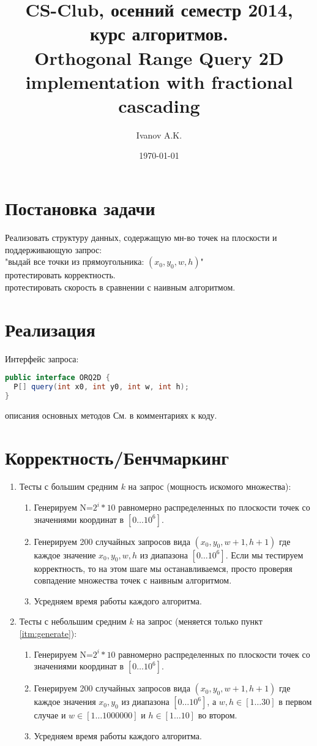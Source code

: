\documentclass[a4paper,12pt]{article}
\title{CS-Club, осенний семестр 2014, курс алгоритмов. \\Orthogonal Range Query 2D implementation with fractional cascading}
\author{Ivanov A.K.}
\date{\today}
\begin{document}
\maketitle

\section{Постановка задачи}
Реализовать структуру данных, содержащую мн-во точек на плоскости и поддерживающую запрос:
\\"выдай все точки из прямоугольника: $(x_0, y_0, w, h)$"
\\протестировать корректность.
\\протестировать скорость в сравнении с наивным алгоритмом.

\section{Реализация}
Интерфейс запроса:
\begin{lstlisting}[language=java]
public interface ORQ2D {
  P[] query(int x0, int y0, int w, int h);
}
\end{lstlisting}
описания основных методов См. в комментариях к коду.

\section{Корректность/Бенчмаркинг}
\begin{enumerate}
\item Тесты с большим средним $k$ на запрос (мощность искомого множества):\begin{enumerate}
\item Генерируем N=$2^i*10$ равномерно распределенных по плоскости точек со значениями координат в  $[0\dots10^6]$.
\item \label{itm:generate} Генерируем 200 случайных запросов вида $(x_0, y_0, w + 1, h + 1)$ где каждое значение $x_0, y_0, w, h$ из диапазона $[0\dots10^6]$. Если мы тестируем корректность, то на этом шаге мы останавливаемся, просто проверяя совпадение множества точек с наивным алгоритмом.
\item Усредняем время работы каждого алгоритма.
\end{enumerate}
\item Тесты с небольшим средним $k$ на запрос (меняется только пункт \ref{itm:generate}):\begin{enumerate}
\item Генерируем N=$2^i*10$ равномерно распределенных по плоскости точек со значениями координат в  $[0\dots10^6]$.
\item Генерируем 200 случайных запросов вида $(x_0, y_0, w + 1, h + 1)$ где каждое значения $x_0, y_0$ из диапазона $[0\dots10^6]$, а $w, h \in [1 \dots 30]$ в первом случае и $w \in [1 \dots 1000000]$ и $h \in [1 \dots 10]$ во втором.
\item Усредняем время работы каждого алгоритма.
\end{enumerate}
\end{enumerate}
\end{document}
